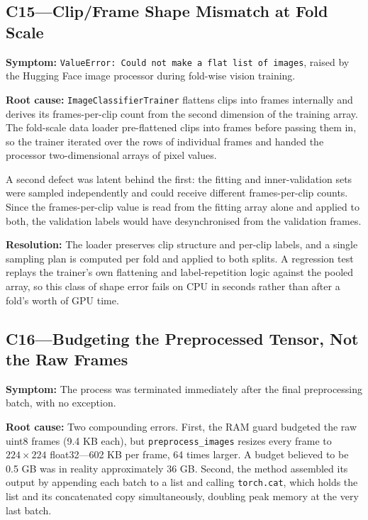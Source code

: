\subsection*{C15---Clip/Frame Shape Mismatch at Fold Scale}

\textbf{Symptom:} \texttt{ValueError: Could not make a flat list of images}, raised by
the Hugging Face image processor during fold-wise vision training.

\textbf{Root cause:} \texttt{ImageClassifierTrainer} flattens clips into frames
internally and derives its frames-per-clip count from the second dimension of the
training array. The fold-scale data loader pre-flattened clips into frames before
passing them in, so the trainer iterated over the rows of individual frames and
handed the processor two-dimensional arrays of pixel values.

A second defect was latent behind the first: the fitting and inner-validation sets
were sampled independently and could receive different frames-per-clip counts. Since
the frames-per-clip value is read from the fitting array alone and applied to both,
the validation labels would have desynchronised from the validation frames.

\textbf{Resolution:} The loader preserves clip structure and per-clip labels, and a
single sampling plan is computed per fold and applied to both splits. A regression
test replays the trainer's own flattening and label-repetition logic against the
pooled array, so this class of shape error fails on CPU in seconds rather than after a
fold's worth of GPU time.

\subsection*{C16---Budgeting the Preprocessed Tensor, Not the Raw Frames}

\textbf{Symptom:} The process was terminated immediately after the final
preprocessing batch, with no exception.

\textbf{Root cause:} Two compounding errors. First, the RAM guard budgeted the raw
uint8 frames (9.4 KB each), but \texttt{preprocess\_images} resizes every frame to
$224 \times 224$ float32---602 KB per frame, 64 times larger. A budget believed to be
0.5 GB was in reality approximately 36 GB. Second, the method assembled its output by
appending each batch to a list and calling \texttt{torch.cat}, which holds the list
and its concatenated copy simultaneously, doubling peak memory at the very last batch.

